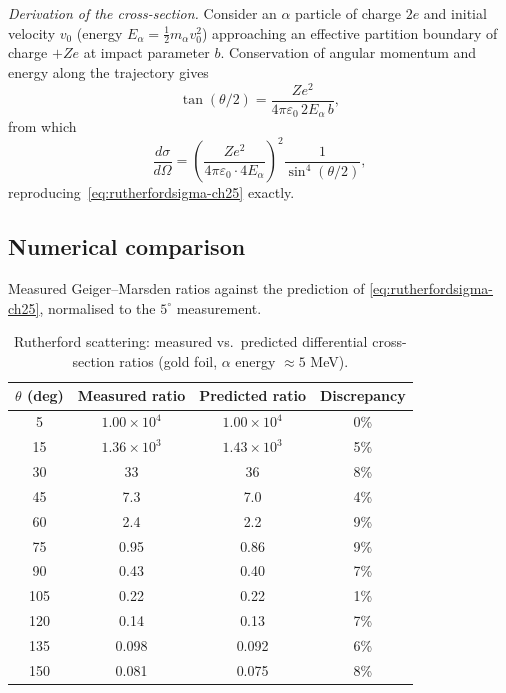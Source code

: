 \emph{Derivation of the cross-section.}  Consider an $\alpha$ particle of
charge $2e$ and initial velocity $v_{0}$ (energy
$E_{\alpha}=\tfrac{1}{2}m_{\alpha}v_{0}^{2}$) approaching an effective
partition boundary of charge $+Ze$ at impact parameter $b$.  Conservation
of angular momentum and energy along the trajectory gives
\begin{equation*}
  \tan(\theta/2)=\frac{Ze^{2}}{4\pi\varepsilon_{0}\,2E_{\alpha}\,b},
\end{equation*}
from which
\begin{equation*}
  \frac{d\sigma}{d\Omega}
  =\left(\frac{Ze^{2}}{4\pi\varepsilon_{0}\cdot 4E_{\alpha}}\right)^{2}
  \frac{1}{\sin^{4}(\theta/2)},
\end{equation*}
reproducing~\eqref{eq:rutherfordsigma-ch25} exactly.

\subsection{Numerical comparison}

Measured Geiger--Marsden ratios against the prediction of
\eqref{eq:rutherfordsigma-ch25}, normalised to the $5^{\circ}$ measurement.

\begin{table}[htbp]
\centering
\caption{Rutherford scattering: measured vs.\ predicted differential
cross-section ratios (gold foil, $\alpha$ energy $\approx 5$ MeV).}
\label{tab:rutherford}
\begin{tabular}{@{}cccc@{}}
\toprule
$\theta$ (deg) & Measured ratio & Predicted ratio & Discrepancy \\
\midrule
5   & $1.00\times 10^{4}$ & $1.00\times 10^{4}$ & 0\% \\
15  & $1.36\times 10^{3}$ & $1.43\times 10^{3}$ & 5\% \\
30  & 33 & 36 & 8\% \\
45  & 7.3 & 7.0 & 4\% \\
60  & 2.4 & 2.2 & 9\% \\
75  & 0.95 & 0.86 & 9\% \\
90  & 0.43 & 0.40 & 7\% \\
105 & 0.22 & 0.22 & 1\% \\
120 & 0.14 & 0.13 & 7\% \\
135 & 0.098 & 0.092 & 6\% \\
150 & 0.081 & 0.075 & 8\% \\
\bottomrule
\end{tabular}
\end{table}

